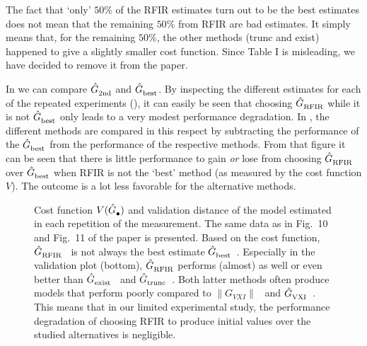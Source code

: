 The fact that ‘only’ $50\%$ of the RFIR estimates turn out to be the best estimates does not mean that the remaining $50\%$ from RFIR are bad estimates. 
It simply means that, for the remaining $50\%$, the other methods (trunc and exist) happened to give a slightly smaller cost function. 
Since Table I is misleading, we have decided to remove it from the paper.

In  we can compare $\hat{G}_{\mathrm{2nd}}^{\mathrm{}}$ and $\hat{G}_{\mathrm{best}}^{\mathrm{}}$.
By inspecting the different estimates for  each of the repeated experiments (), it can easily be seen that choosing $\hat{G}_{\mathrm{RFIR}}^{\mathrm{}}$ while it is not $\hat{G}_{\mathrm{best}}^{\mathrm{}}$ only leads to a very modest performance degradation.
In , the different methods are compared in this respect by subtracting the performance of the $\hat{G}_{\mathrm{best}}^{\mathrm{}}$ from the performance of the respective methods.
From that figure it can be seen that there is little performance to gain \emph{or} lose from choosing $\hat{G}_{\mathrm{RFIR}}^{\mathrm{}}$ over $\hat{G}_{\mathrm{best}}^{\mathrm{}}$ when RFIR is not the `best' method (as measured by the cost function $V$).
The outcome is a lot less favorable for the alternative methods.

\begin{figure}
  \centering
  \setlength{\figurewidth}{0.85\columnwidth}
  \setlength{\figureheight}{0.68\figurewidth}
  
  \caption{Cost function $V(\hat{G}_{\mathrm{\bullet}}^{\mathrm{}})$ and validation distance of the model estimated in each repetition of the measurement.
  The same data as in Fig.~10 and Fig.~11 of the paper is presented.
  Based on the cost function, $\hat{G}_{\mathrm{RFIR}}^{\mathrm{}}$~ is not always the best estimate $\hat{G}_{\mathrm{best}}^{\mathrm{}}$~.
  Especially in the validation plot (bottom), $\hat{G}_{\mathrm{RFIR}}^{\mathrm{}}$ performs (almost) as well or even better than $\hat{G}_{\mathrm{exist}}^{\mathrm{}}$~ and $\hat{G}_{\mathrm{trunc}}^{\mathrm{}}$~.
  Both latter methods often produce models that perform poorly compared to $\| G_{VXI} \|$~ and $\hat{G}_{\mathrm{VXI}}^{\mathrm{}}$~.
  This means that in our limited experimental study, the performance degradation of choosing RFIR to produce initial values over the studied alternatives is negligible.}
  \label{fig:overview}
\end{figure}

